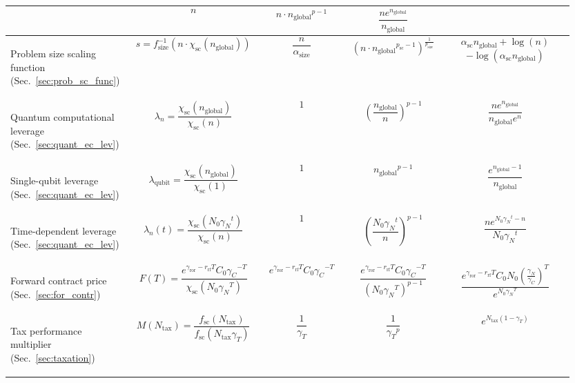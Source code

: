 \begin{table}[!htb]
\begin{tabular}{|m{0.21\linewidth}|m{0.21\linewidth}|m{0.15\linewidth}|m{0.155\linewidth}|m{0.225\linewidth}|}
\[\] & \[n\] & \[n\cdot{n_\text{global}}^{p-1}\] & \[\frac{n e^{n_\text{global}}}{n_\text{global}}\]\\
	\hline
	\begin{flushleft}Problem size scaling function (Sec.~\ref{sec:prob_sc_func})\end{flushleft} & \[s = f_\text{size}^{-1}(n\cdot \chi_\text{sc}(n_\text{global}))\] & \[\frac{n}{\alpha_\text{size}}\] & \[(n \cdot {n_\text{global}}^{p_\text{sc}-1})^\frac{1}{p_\text{size}}\] & \[\alpha_\text{sc}n_\text{global} + \log(n)\]\[-\log(\alpha_\text{sc}n_\text{global})\] \\
	\hline
	\begin{flushleft}Quantum computational leverage (Sec.~\ref{sec:quant_ec_lev})\end{flushleft} & \[\lambda_n=\frac{\chi_\text{sc}(n_\text{global})}{\chi_\text{sc}(n)}\] & \[1\] & \[\left(\frac{n_\text{global}}{n}\right)^{p-1}\] & \[\frac{n e^{n_\text{global}}}{n_\text{global}e^n}\]\\
	\hline
	\begin{flushleft}Single-qubit leverage (Sec.~\ref{sec:quant_ec_lev})\end{flushleft} & \[\lambda_\text{qubit}=\frac{\chi_\text{sc}(n_\text{global})}{\chi_\text{sc}(1)}\] & \[1\] & \[{n_\text{global}}^{p-1}\] & \[\frac{e^{n_\text{global}-1}}{n_\text{global}}\]\\
	\hline
	\begin{flushleft}Time-dependent leverage (Sec.~\ref{sec:quant_ec_lev})\end{flushleft} & \[\lambda_n(t)=\frac{\chi_\text{sc}(N_0{\gamma_N}^t)}{\chi_\text{sc}(n)}\] &  \[1\] & \[\left(\frac{N_0{\gamma_N}^t}{n}\right)^{p-1}\] & \[\frac{n e^{N_0{\gamma_N}^t-n}}{N_0{\gamma_N}^t}\]\\
	\hline
	\begin{flushleft}Forward contract price (Sec.~\ref{sec:for_contr})\end{flushleft} & \[F(T)=\frac{e^{\gamma_\text{ror}-r_\text{rf}T} C_0{\gamma_C}^{-T}}{\chi_\text{sc}(N_0 {\gamma_N}^T)}\]
 & \[e^{\gamma_\text{ror}-r_\text{rf}T} C_0{\gamma_C}^{-T}\] & \[\frac{e^{\gamma_\text{ror}-r_\text{rf}T} C_0{\gamma_C}^{-T}}{(N_0 {\gamma_N}^T)^{p-1}}\] & \[\frac{e^{\gamma_\text{ror}-r_\text{rf}T} C_0N_0\left(\frac{\gamma_N}{\gamma_C}\right)^T}{e^{N_0 {\gamma_N}^T}}\] \\
	\hline
	\begin{flushleft}Tax performance multiplier (Sec.~\ref{sec:taxation})\end{flushleft} & \[M(N_\text{tax})=\frac{f_\text{sc}(N_\text{tax})}{f_\text{sc}(N_\text{tax} \gamma_T)}\] & \[\frac{1}{\gamma_T}\] & \[\frac{1}{{\gamma_T}^p}\] & \[e^{N_\text{tax}(1-\gamma_T)}\]\\

\end{tabular}
\end{table}
